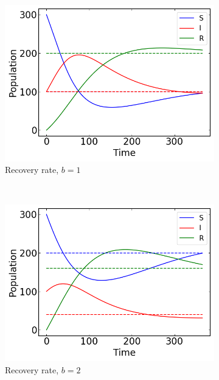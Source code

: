 \begin{figure}[H]
    \centering
    \begin{subfigure}{0.49\textwidth}
        \centering
        \includegraphics[width=\linewidth]{../fig/texfig/RK4_b1T1.png}
        \caption{Recovery rate, $b = 1$}
    \end{subfigure}%
     ~ 
    \begin{subfigure}{0.49\textwidth}
         \centering
         \includegraphics[width=\linewidth]{../fig/texfig/RK4_b2T1.png}
         \caption{Recovery rate, $b = 2$}
    \end{subfigure}
     ~ 
    \begin{subfigure}{0.49\textwidth}
         \centering

\end{subfigure}
\end{figure}

